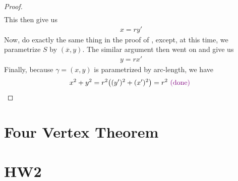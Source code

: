 \documentclass{report}
\begin{document}
\begin{proof}
\begin{align*}
\end{align*}
This then give us 
\begin{align*}
x=ry' 
\end{align*}
Now, do exactly the same thing in the proof of , except, at this time, we parametrize $S$ by  $(\overline{x},y)$. The similar argument then went on and give us 
\begin{align*}
y=rx'
\end{align*}
Finally, because $\gamma =(x,y)$ is parametrized by arc-length, we have
\begin{align*}
x^2+y^2=r^2\big((y')^2+(x')^2 \big)=r^2\textcolor{violet}{\text{ (done) }}
\end{align*}

\end{proof}
\section{Four Vertex Theorem}
\section{HW2}
\end{document}
